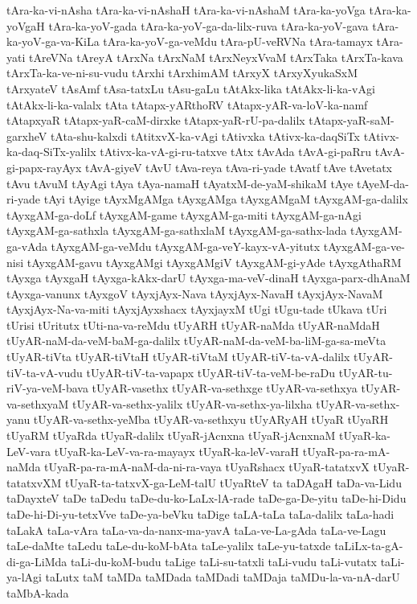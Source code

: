 {tAra-ka-vi-nAsha
tAra-ka-vi-nAshaH
tAra-ka-vi-nAshaM
tAra-ka-yoVga
tAra-ka-yoVgaH
tAra-ka-yoV-gada
tAra-ka-yoV-ga-da-lilx-ruva
tAra-ka-yoV-gava
tAra-ka-yoV-ga-va-KiLa
tAra-ka-yoV-ga-veMdu
tAra-pU-veRVNa
tAra-tamayx
tAra-yati
tAreVNa
tAreyA
tArxNa
tArxNaM
tArxNeyxVvaM
tArxTaka
tArxTa-kava
tArxTa-ka-ve-ni-su-vudu
tArxhi
tArxhimAM
tArxyX
tArxyXyukaSxM
tArxyateV
tAsAmf
tAsa-tatxLu
tAsu-gaLu
tAtAkx-lika
tAtAkx-li-ka-vAgi
tAtAkx-li-ka-valalx
tAta
tAtapx-yARthoRV
tAtapx-yAR-va-loV-ka-namf
tAtapxyaR
tAtapx-yaR-caM-dirxke
tAtapx-yaR-rU-pa-dalilx
tAtapx-yaR-saM-garxheV
tAta-shu-kalxdi
tAtitxvX-ka-vAgi
tAtivxka
tAtivx-ka-daqSiTx
tAtivx-ka-daq-SiTx-yalilx
tAtivx-ka-vA-gi-ru-tatxve
tAtx
tAvAda
tAvA-gi-paRru
tAvA-gi-papx-rayAyx
tAvA-giyeV
tAvU
tAva-reya
tAva-ri-yade
tAvatf
tAve
tAvetatx
tAvu
tAvuM
tAyAgi
tAya
tAya-namaH
tAyatxM-de-yaM-shikaM
tAye
tAyeM-da-ri-yade
tAyi
tAyige
tAyxMgAMga
tAyxgAMga
tAyxgAMgaM
tAyxgAM-ga-dalilx
tAyxgAM-ga-doLf
tAyxgAM-game
tAyxgAM-ga-miti
tAyxgAM-ga-nAgi
tAyxgAM-ga-sathxla
tAyxgAM-ga-sathxlaM
tAyxgAM-ga-sathx-lada
tAyxgAM-ga-vAda
tAyxgAM-ga-veMdu
tAyxgAM-ga-veY-kayx-vA-yitutx
tAyxgAM-ga-ve-nisi
tAyxgAM-gavu
tAyxgAMgi
tAyxgAMgiV
tAyxgAM-gi-yAde
tAyxgAthaRM
tAyxga
tAyxgaH
tAyxga-kAkx-darU
tAyxga-ma-veV-dinaH
tAyxga-parx-dhAnaM
tAyxga-vanunx
tAyxgoV
tAyxjAyx-Nava
tAyxjAyx-NavaH
tAyxjAyx-NavaM
tAyxjAyx-Na-va-miti
tAyxjAyxshacx
tAyxjayxM
tUgi
tUgu-tade
tUkava
tUri
tUrisi
tUritutx
tUti-na-va-reMdu
tUyARH
tUyAR-naMda
tUyAR-naMdaH
tUyAR-naM-da-veM-baM-ga-dalilx
tUyAR-naM-da-veM-ba-liM-ga-sa-meVta
tUyAR-tiVta
tUyAR-tiVtaH
tUyAR-tiVtaM
tUyAR-tiV-ta-vA-dalilx
tUyAR-tiV-ta-vA-vudu
tUyAR-tiV-ta-vapapx
tUyAR-tiV-ta-veM-be-raDu
tUyAR-tu-riV-ya-veM-bava
tUyAR-vasethx
tUyAR-va-sethxge
tUyAR-va-sethxya
tUyAR-va-sethxyaM
tUyAR-va-sethx-yalilx
tUyAR-va-sethx-ya-lilxha
tUyAR-va-sethx-yanu
tUyAR-va-sethx-yeMba
tUyAR-va-sethxyu
tUyARyAH
tUyaR
tUyaRH
tUyaRM
tUyaRda
tUyaR-dalilx
tUyaR-jAcnxna
tUyaR-jAcnxnaM
tUyaR-ka-LeV-vara
tUyaR-ka-LeV-va-ra-mayayx
tUyaR-ka-leV-varaH
tUyaR-pa-ra-mA-naMda
tUyaR-pa-ra-mA-naM-da-ni-ra-vaya
tUyaRshacx
tUyaR-tatatxvX
tUyaR-tatatxvXM
tUyaR-ta-tatxvX-ga-LeM-talU
tUyaRteV
ta
taDAgaH
taDa-va-Lidu
taDayxteV
taDe
taDedu
taDe-du-ko-LaLx-lA-rade
taDe-ga-De-yitu
taDe-hi-Didu
taDe-hi-Di-yu-tetxVve
taDe-ya-beVku
taDige
taLA-taLa
taLa-dalilx
taLa-hadi
taLakA
taLa-vAra
taLa-va-da-nanx-ma-yavA
taLa-ve-La-gAda
taLa-ve-Lagu
taLe-daMte
taLedu
taLe-du-koM-bAta
taLe-yalilx
taLe-yu-tatxde
taLiLx-ta-gA-di-ga-LiMda
taLi-du-koM-budu
taLige
taLi-su-tatxli
taLi-vudu
taLi-vutatx
taLi-ya-lAgi
taLutx
taM
taMDa
taMDada
taMDadi
taMDaja
taMDu-la-va-nA-darU
taMbA-kada
}
